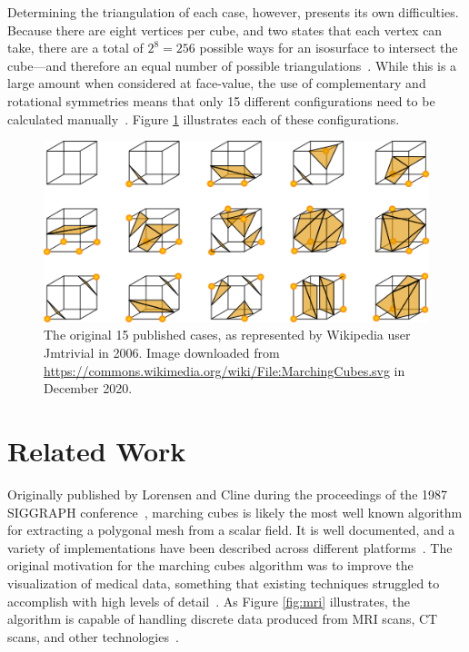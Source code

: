 \documentclass[pageno]{jpaper}
\begin{document}
Determining the triangulation of each case, however, presents its own difficulties. Because there are eight vertices per cube, and two states that each vertex can take, there are a total of $2^8 = 256$ possible ways for an isosurface to intersect the cube—and therefore an equal number of possible triangulations~\cite{lorensen,kieran}. While this is a large amount when considered at face-value, the use of complementary and rotational symmetries means that only 15 different configurations need to be calculated manually~\cite{lorensen,kieran}. Figure \ref{fig:cubecases} illustrates each of these configurations.

\begin{figure}[hbt]
\centering
\includegraphics[width=0.75\linewidth]{MarchingCubes.png}
\caption{The original 15 published cases, as represented by Wikipedia user Jmtrivial in 2006. Image downloaded from \url{https://commons.wikimedia.org/wiki/File:MarchingCubes.svg} in December 2020.}
\label{fig:cubecases}
\end{figure}

\section{Related Work}

Originally published by Lorensen and Cline during the proceedings of the 1987 SIGGRAPH conference~\cite{lorensen}, marching cubes is likely the most well known algorithm for extracting a polygonal mesh from a scalar field. It is well documented, and a variety of implementations have been described across different platforms~\cite{lorensen,bourke,bloyd}. The original motivation for the marching cubes algorithm was to improve the visualization of medical data, something that existing techniques struggled to accomplish with high levels of detail~\cite{lorensen}. As Figure \ref{fig:mri} illustrates, the algorithm is capable of handling discrete data produced from MRI scans, CT scans, and other technologies~\cite{lorensen}.
\end{document}
